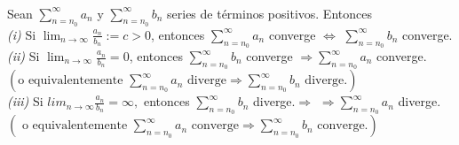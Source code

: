 \documentclass{article}
\theoremstyle{definition}
\theoremstyle{remark}
\begin{document}
\begin{teo} \; \\
  Sean $\sum_{n=n_0}^{\infty}{a_n}$ y $\sum_{n=n_0}^{\infty}{b_n}$ series de términos positivos. Entonces \\
  \emph{(i)} \quad Si $\lim_{n \to \infty}{\frac{a_n}{b_n}}:=c>0$, entonces $\sum_{n=n_0}^{\infty}{a_n}$ converge $\Leftrightarrow$ $\sum_{n=n_0}^{\infty}{b_n}$ converge. \\
  \emph{(ii)}\phantom{ii}   Si $\lim_{n\to\infty}{\frac{a_n}{b_n}}=0$, entonces $\sum_{n=n_0}^{\infty}{b_n}$ converge $\Rightarrow \sum_{n=n_0}^{\infty}{a_n}$ converge. $\left(\text{o equivalentemente }\sum_{n=n_0}^{\infty}{a_n} \text{ diverge} \Rightarrow \sum_{n=n_0}^{\infty}{b_n}\text{ diverge.}\right)$ \\
  \emph{(iii)}\; Si $lim_{n\to\infty}{\frac{a_n}{b_n}}=\infty,$ entonces $\sum_{n=n_0}^{\infty}{b_n}$ diverge.$\Rightarrow$ $\Rightarrow \sum_{n=n_0}^{\infty}{a_n}$ diverge.\\ $\left(\text{ o equivalentemente $\sum_{n=n_0}^{\infty}{a_n}\text{ converge} \Rightarrow \sum_{n=n_0}^{\infty}{b_n}\text{ converge.}$}\right)$ 

\end{teo}
\end{document}
